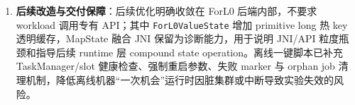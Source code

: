 \documentclass[a4paper,11pt]{article}
\begin{document}
\begin{enumerate}
  \item \textbf{后续改造与交付保障}：后续优化明确收敛在 ForL0 后端内部，不要求 workload 调用专有 API；其中 \texttt{ForL0ValueState} 增加 primitive long 热 key 透明缓存，MapState 融合 JNI 保留为诊断能力，用于说明 JNI/API 粒度瓶颈和指导后续 runtime 层 compound state operation。离线一键脚本已补充 TaskManager/slot 健康检查、强制重启参数、失败 marker 与 orphan job 清理机制，降低离线机器“一次机会”运行时因脏集群或中断导致实验失效的风险。
\end{enumerate}
\end{document}
